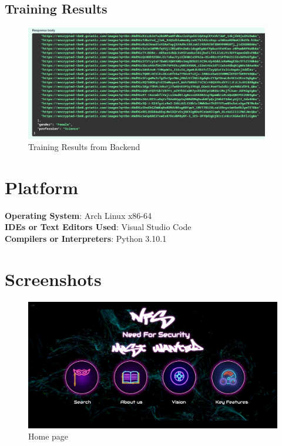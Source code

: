 \documentclass[openany]{report}
\begin{document}
\subsection{Training Results}

\begin{figure}[H]
    \begin{small}
        \begin{center}
            \includegraphics[width=0.95\textwidth]{training res.png}
        \end{center}
        \caption{Training Results from Backend}
        \label{fig:Training Results}
    \end{small}
\end{figure}

\section{Platform}
\textbf{Operating System}: Arch Linux x86-64 \\
\textbf{IDEs or Text Editors Used}: Visual Studio Code\\
\textbf{Compilers or Interpreters}: Python 3.10.1\\

\section{Screenshots}

\begin{figure}[H]
    \centering
    \includegraphics[width=.95\textwidth]{../screenshots/home page.png}
    \caption{Home page}
    \label{fig:home page}
\end{figure}
\end{document}
